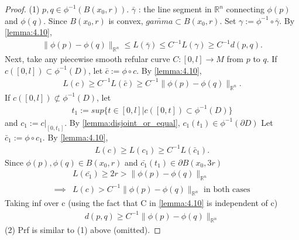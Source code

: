 \begin{proof}
    (1) $p,q \in \phi^{-1}({B}(x_0, r))$. $\bar{\gamma}$ : the line segment in $\mathbb{R}^n$ connecting $\phi(p)$ and $\phi(q)$. 
    Since $B(x_0, r)$ is convex, $\bar{gamma} \subset B(x_0, r)$. Set $\gamma := \phi^{-1} \circ \bar{\gamma}$.
    By \autoref{lemma:4.10},
    \[
    \begin{aligned}
        \|\phi(p) - \phi(q) \|_{\mathbb{R}^n} \leq L(\bar{\gamma}) \leq C^{-1} L(\gamma) \geq C^{-1} d(p,q).
    \end{aligned}
    \]
    Next, take any piecewise smooth refular curve $C: [0,l] \to M$ from $p$ to $q$. 
    If $c([0,l]) \subset \phi^{-1}(D)$, let $\bar{c} := \phi \circ c$. By \autoref{lemma:4.10},
    \[
    \begin{aligned}
        L(c) \geq C^{-1} L(\bar{c}) \geq C^{-1} \|\phi(p) - \phi(q)\|_{\mathbb{R}^n}.
    \end{aligned}
    \]
    If $c([0,l]) \not\subset \phi^{-1}(D)$, let
    \[
    \begin{aligned}
        t_1 := sup \{t\in [0,l] | c([0,t]) \subset \phi^{-1}(D)\}
    \end{aligned}
    \]
    and $c_1 := c|_{[0,t_1]}$. By \autoref{lemma:disjoint_or_equal}, $c_1(t_1) \in \phi^{-1}(\partial D)$
    Let $\bar{c}_1 := \phi \circ c_1$. By \autoref{lemma:4.10},
    \[
    \begin{aligned}
        L(c) \geq L(c_1) \geq C^{-1} L(\bar{c}_1).
    \end{aligned}
    \]
    Since $\phi(p), \phi(q) \in B(x_0, r )$ and $\bar{c_1}(t_1) \in \partial B(x_0, 3r)$
    \[
    \begin{aligned}
        &L(\bar{c_1}) \geq 2r > \|\phi(p)-\phi(q)\|_{\mathbb{R}^n} \\
       \implies &L(c) > C^{-1} \|\phi(p) - \phi(q)\|_{\mathbb{R}^n} \text{ in both cases}
    \end{aligned}\]
    Taking inf over c (using the fact that C in \autoref{lemma:4.10} is independent of c)
    \[
    \begin{aligned}
        d(p,q) \geq C^{-1} \|\phi(p) - \phi(q) \|_{\mathbb{R}^n}
    \end{aligned}
    \]
    (2) Prf is similar to (1) above (omitted).
\end{proof}

